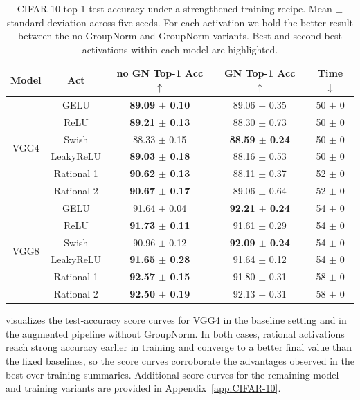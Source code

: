 \documentclass{article}
\theoremstyle{plain}
\theoremstyle{definition}
\theoremstyle{remark}
\begin{document}
\begin{table}
\centering
\caption{CIFAR-10 top-1 test accuracy under a strengthened training recipe. Mean $\pm$ standard deviation across five seeds. For each activation we bold the better result between the no GroupNorm and GroupNorm variants. Best and second-best activations within each model are highlighted.}
\label{tab:cifar10_gn_nogn}
\renewcommand{\arraystretch}{1.08}
\scriptsize
\setlength{\tabcolsep}{2.6pt}
\begin{tabular}{@{}ccccc@{}}
\toprule
Model & Act & no GN Top-1 Acc $\uparrow$ & GN Top-1 Acc $\uparrow$ & Time $\downarrow$ \\
\midrule
\multirow{6}{*}{VGG4} & GELU & \textbf{89.09 $\pm$ 0.10} & \cellcolor{green!22} {89.06 $\pm$ 0.35} & 50 $\pm$ 0 \\
& ReLU & \textbf{89.21 $\pm$ 0.13} & 88.30 $\pm$ 0.73 & 50 $\pm$ 0 \\
& Swish & 88.33 $\pm$ 0.15 & \cellcolor{orange!22}\textbf{88.59 $\pm$ 0.24} & 50 $\pm$ 0 \\
& LeakyReLU & \textbf{89.03 $\pm$ 0.18} & 88.16 $\pm$ 0.53 & 50 $\pm$ 0 \\
& {Rational 1} & \cellcolor{orange!22}\textbf{90.62 $\pm$ 0.13} & 88.11 $\pm$ 0.37 & 52 $\pm$ 0 \\
& {Rational 2} & \cellcolor{green!22}\textbf{90.67 $\pm$ 0.17} & \cellcolor{green!22} 89.06 $\pm$ 0.64 & 52 $\pm$ 0 \\
\midrule
\multirow{6}{*}{VGG8} & GELU & 91.64 $\pm$ 0.04 & \cellcolor{green!22}\textbf{92.21 $\pm$ 0.24} & 54 $\pm$ 0 \\
& ReLU & \textbf{91.73 $\pm$ 0.11} & 91.61 $\pm$ 0.29 & 54 $\pm$ 0 \\
& Swish & 90.96 $\pm$ 0.12 & \textbf{92.09 $\pm$ 0.24} & 54 $\pm$ 0 \\
& LeakyReLU & \textbf{91.65 $\pm$ 0.28} & 91.64 $\pm$ 0.12 & 54 $\pm$ 0 \\
& {Rational 1} & \cellcolor{green!22}\textbf{92.57 $\pm$ 0.15} & 91.80 $\pm$ 0.31 & 58 $\pm$ 0 \\
& {Rational 2} & \cellcolor{orange!22}\textbf{92.50 $\pm$ 0.19} & \cellcolor{orange!22} 92.13 $\pm$ 0.31 & 58 $\pm$ 0 \\
\bottomrule
\end{tabular}
\end{table}

 visualizes the test-accuracy score curves for VGG4 in the baseline setting and in the augmented pipeline without GroupNorm. In both cases, rational activations reach strong accuracy earlier in training and converge to a better final value than the fixed baselines, so the score curves corroborate the advantages observed in the best-over-training summaries. Additional score curves for the remaining model and training variants are provided in Appendix~\ref{app:CIFAR-10}.
\end{document}
